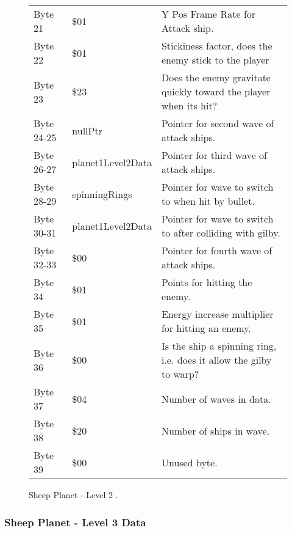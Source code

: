 \begin{figure}[H]
{\begin{adjustbox}{width=12cm}
\begin{tabular}{lll}
 Byte 21    & \$01               & Y Pos Frame Rate for Attack ship.                                   \\
 Byte 22    & \$01               & Stickiness factor, does the enemy stick to the player               \\
 Byte 23    & \$23               & Does the enemy gravitate quickly toward the player when its hit?    \\
 Byte 24-25 & nullPtr           & Pointer for second wave of attack ships.                            \\
 Byte 26-27 & planet1Level2Data & Pointer for third wave of attack ships.                             \\
 Byte 28-29 & spinningRings     & Pointer for wave to switch to when hit by bullet.                   \\
 Byte 30-31 & planet1Level2Data & Pointer for  wave to switch to after colliding with gilby.          \\
 Byte 32-33 & \$00               & Pointer for fourth wave of attack ships.                            \\
 Byte 34    & \$01               & Points for hitting the enemy.                                       \\
 Byte 35    & \$01               & Energy increase multiplier for hitting an enemy.                    \\
 Byte 36    & \$00               & Is the ship a spinning ring, i.e. does it allow the gilby to warp?  \\
 Byte 37    & \$04               & Number of waves in data.                                            \\
 Byte 38    & \$20               & Number of ships in wave.                                            \\
 Byte 39    & \$00               & Unused byte.                                                        \\
\bottomrule
\end{tabular}

  \end{adjustbox}

  }\caption*{Sheep Planet - Level 2
.}
\end{figure}

\clearpage
\subsubsection{Sheep Planet - Level 3 Data}

